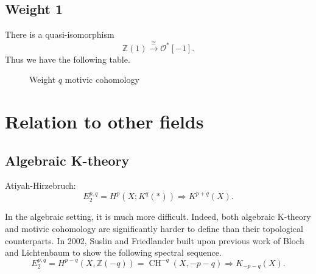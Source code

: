 \documentclass[leqno, openany]{memoir}
\theoremstyle{definition}
\theoremstyle{remark}
\theoremstyle{plain}
\theoremstyle{definition}
\theoremstyle{remark}
\newcommand{\Z}{\mathbb{Z}}
\newcommand{\mc}[1]{\mathcal{#1}}
\DeclareMathOperator{\Pic}{Pic}
\DeclareMathOperator{\CH}{CH}
\begin{document}
\subsection{Weight 1} 
There is a quasi-isomorphism 
\[
\Z(1)\xrightarrow{\cong}\mc{O}^*[-1].
\]
Thus we have the following table.

\begin{figure}[htpb]
\begin{center}
\end{center}
\caption{Weight $q$ motivic cohomology}%
\label{fig:}
\end{figure}


 

\section{Relation to other fields} 
\subsection{Algebraic K-theory}
Atiyah-Hirzebruch: 
\[E_2^{p, q}=H^p(X; K^q(*))\Rightarrow K^{p+q}(X).\]

In the algebraic setting, it is much more difficult.  Indeed, both algebraic K-theory and motivic cohomology are significantly harder to define than their topological counterparts.  In 2002, Suslin and Friedlander built upon previous work of Bloch and Lichtenbaum to show the following spectral sequence. 
\[
E_2^{p,q}=H^{p-q}(X, \Z(-q))=\CH^{-q}(X, -p-q)\Rightarrow K_{-p-q}(X).
\]
\end{document}
